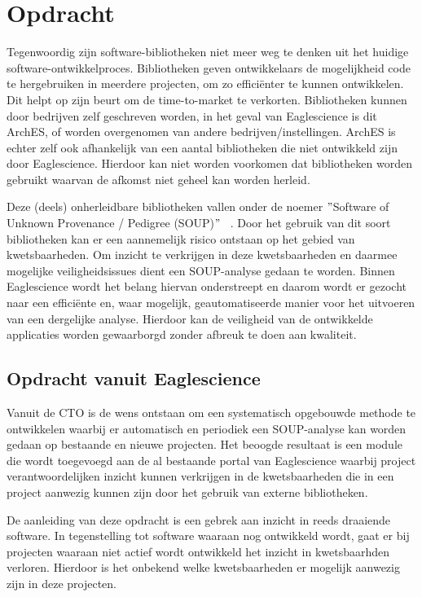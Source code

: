
\chapter{Opdracht}\label{ch:opdracht} %
Tegenwoordig zijn software-bibliotheken niet meer weg te denken uit het huidige software-ontwikkelproces. Bibliotheken geven ontwikkelaars de mogelijkheid code te hergebruiken in meerdere projecten, om zo efficiënter te kunnen ontwikkelen. Dit helpt op zijn beurt om de time-to-market te verkorten. Bibliotheken kunnen door bedrijven zelf geschreven worden, in het geval van Eaglescience is dit ArchES, of worden overgenomen van andere bedrijven/instellingen. ArchES is echter zelf ook afhankelijk van een aantal bibliotheken die niet ontwikkeld zijn door Eaglescience. Hierdoor kan niet worden voorkomen dat bibliotheken worden gebruikt waarvan de afkomst niet geheel kan worden herleid.

Deze (deels) onherleidbare bibliotheken vallen onder de noemer $"$Software of Unknown Provenance / Pedigree (SOUP)$"$ ~\citep{Bischop:2001}. Door het gebruik van dit soort bibliotheken kan er een aannemelijk risico ontstaan op het gebied van kwetsbaarheden. Om inzicht te verkrijgen in deze kwetsbaarheden en daarmee mogelijke veiligheidsissues dient een SOUP-analyse gedaan te worden. Binnen Eaglescience wordt het belang hiervan onderstreept en daarom wordt er gezocht naar een efficiënte en, waar mogelijk, geautomatiseerde manier voor het uitvoeren van een dergelijke analyse. Hierdoor kan de veiligheid van de ontwikkelde applicaties worden gewaarborgd zonder afbreuk te doen aan kwaliteit.

\section{Opdracht vanuit Eaglescience}\label{sec:opdracht-vanuit-Eaglescience}

Vanuit de CTO is de wens ontstaan om een systematisch opgebouwde methode te ontwikkelen waarbij er automatisch en periodiek een SOUP-analyse kan worden gedaan op bestaande en nieuwe projecten. Het beoogde resultaat is een module die wordt toegevoegd aan de al bestaande portal van Eaglescience waarbij project verantwoordelijken inzicht kunnen verkrijgen in de kwetsbaarheden die in een project aanwezig kunnen zijn door het gebruik van externe bibliotheken.

De aanleiding van deze opdracht is een gebrek aan inzicht in reeds draaiende software. In tegenstelling tot software waaraan nog ontwikkeld wordt, gaat er bij projecten waaraan niet actief wordt ontwikkeld het inzicht in kwetsbaarhden verloren. Hierdoor is het onbekend welke kwetsbaarheden er mogelijk aanwezig zijn in deze projecten.
